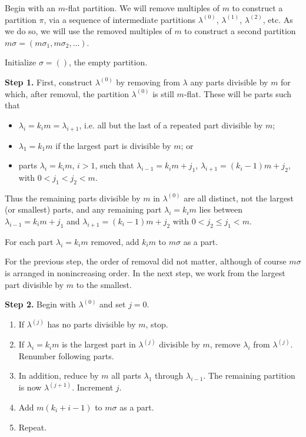 \documentclass[11pt]{article}
\begin{document}
Begin with an $m$-flat partition.  We will remove multiples of $m$ to construct a partition $\pi$, via a sequence of intermediate partitions $\lambda^{(0)}$, $\lambda^{(1)}$, $\lambda^{(2)}$, etc.  As we do so, we will use the removed multiples of $m$ to construct a second partition $m\sigma = (m\sigma_1,m\sigma_2,\dots)$.

Initialize $\sigma = ()$, the empty partition.  

\textbf{Step 1.} First, construct $\lambda^{(0)}$ by removing from $\lambda$ any parts divisible by $m$ for which, after removal, the partition $\lambda^{(0)}$ is still $m$-flat.  These will be parts such that

\begin{itemize}
\item $\lambda_i = k_i m = \lambda_{i+1}$, i.e. all but the last of a repeated part divisible by $m$; 
\item $\lambda_1 = k_1 m$ if the largest part is divisible by $m$; or
\item parts $\lambda_i = k_i m$, $i>1$, such that $\lambda_{i-1} = k_i m+j_1$, $\lambda_{i+1} = (k_i-1)m + j_2$, with $0 < j_1 < j_2 < m$.
\end{itemize}

Thus the remaining parts divisible by $m$ in $\lambda^{(0)}$ are all distinct, not the largest (or smallest) parts, and any remaining part $\lambda_i = k_i m$ lies between $\lambda_{i-1} = k_i m + j_1$ and $\lambda_{i+1} = (k_i-1)m+j_2$ with $0 < j_2 \leq j_1 < m$.

For each part $\lambda_i = k_i m$ removed, add $k_i m$ to $m\sigma$ as a part.

For the previous step, the order of removal did not matter, although of course $m \sigma$ is arranged in nonincreasing order.  In the next step, we work from the largest part divisible by $m$ to the smallest.

\textbf{Step 2.} Begin with $\lambda^{(0)}$ and set $j=0$.

\begin{enumerate}
\item If $\lambda^{(j)}$ has no parts divisible by $m$, stop.
\item If $\lambda_i = k_i m$ is the largest part in $\lambda^{(j)}$ divisible by $m$, remove $\lambda_i$ from $\lambda^{(j)}$.  Renumber following parts.
\item In addition, reduce by $m$ all parts $\lambda_1$ through $\lambda_{i-1}$.  The remaining partition is now $\lambda^{(j+1)}$.  Increment $j$.
\item Add $m(k_i + i - 1)$ to $m\sigma$ as a part.
\item Repeat.
\end{enumerate} 
\end{document}

